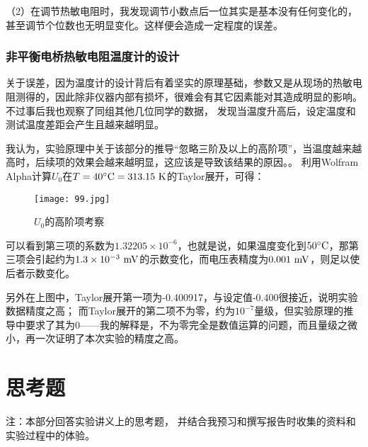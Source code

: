 \documentclass[11pt]{article}
\begin{document}
（2）在调节热敏电阻时，我发现调节小数点后一位其实是基本没有任何变化的，
甚至调节个位数也无明显变化。这样便会造成一定程度的误差。



\subsubsection{非平衡电桥热敏电阻温度计的设计}
关于误差，因为温度计的设计背后有着坚实的原理基础，参数又是从现场的热敏电阻测得的，因此除非仪器内部有损坏，很难会有其它因素能对其造成明显的影响。不过事后我也观察了同组其他几位同学的数据，
发现当温度升高后，设定温度和测试温度差距会产生且越来越明显。

我认为，实验原理中关于该部分的推导“忽略三阶及以上的高阶项”，当温度越来越高时，后续项的效果会越来越明显，这应该是导致该结果的原因。。
利用Wolfram Alpha计算$U_0$在$T=40^\circ \rm C=313.15\,\,K$的Taylor展开，可得：
\begin{figure}[H]
    \centering
    \texttt{[image: 99.jpg]}
    \caption{$U_0$的高阶项考察}
\end{figure}
可以看到第三项的系数为$1.32205\times10^{-6}$，也就是说，如果温度变化到$50^\circ \rm C$，那第三项会引起约为$1.3\times10^{-3}\,\,\rm mV$的示数变化，而电压表精度为$0.001\,\,\rm mV$，则足以使后者示数变化。

另外在上图中，Taylor展开第一项为-0.400917，与设定值-0.400很接近，说明实验数据精度之高；
而Taylor展开的第二项不为零，约为$10^{-7}$量级，但实验原理的推导中要求了其为0——我的解释是，不为零完全是数值运算的问题，而且量级之微小，再一次证明了本次实验的精度之高。






























\section{思考题}
{\kaishu 
    注：本部分回答实验讲义上的思考题，
    并结合我预习和撰写报告时收集的资料和实验过程中的体验。
}
\end{document}
